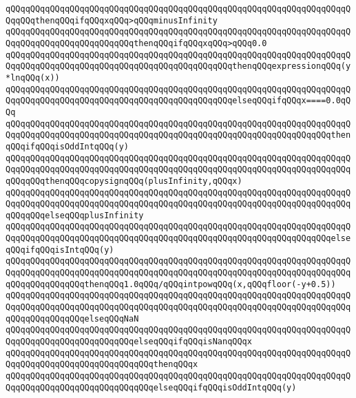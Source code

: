 \verb|qQQqqQQqqQQqqQQqqQQqqQQqqQQqqQQqqQQqqQQqqQQqqQQqqQQqqQQqqQQqqQQqqQQqqQQqqQQqthenqQQqifqQQqxqQQq>qQQqminusInfinity|\newline
\verb|qQQqqQQqqQQqqQQqqQQqqQQqqQQqqQQqqQQqqQQqqQQqqQQqqQQqqQQqqQQqqQQqqQQqqQQqqQQqqQQqqQQqqQQqqQQqqQQqthenqQQqifqQQqxqQQq>qQQq0.0|\newline
\verb|qQQqqQQqqQQqqQQqqQQqqQQqqQQqqQQqqQQqqQQqqQQqqQQqqQQqqQQqqQQqqQQqqQQqqQQqqQQqqQQqqQQqqQQqqQQqqQQqqQQqqQQqqQQqqQQqqQQqthenqQQqexpressionqQQq(y*lnqQQq(x))|\newline
\verb|qQQqqQQqqQQqqQQqqQQqqQQqqQQqqQQqqQQqqQQqqQQqqQQqqQQqqQQqqQQqqQQqqQQqqQQqqQQqqQQqqQQqqQQqqQQqqQQqqQQqqQQqqQQqqQQqqQQqelseqQQqifqQQqx====0.0qQQq|\newline
\verb|qQQqqQQqqQQqqQQqqQQqqQQqqQQqqQQqqQQqqQQqqQQqqQQqqQQqqQQqqQQqqQQqqQQqqQQqqQQqqQQqqQQqqQQqqQQqqQQqqQQqqQQqqQQqqQQqqQQqqQQqqQQqqQQqqQQqqQQqthenqQQqifqQQqisOddIntqQQq(y)|\newline
\verb|qQQqqQQqqQQqqQQqqQQqqQQqqQQqqQQqqQQqqQQqqQQqqQQqqQQqqQQqqQQqqQQqqQQqqQQqqQQqqQQqqQQqqQQqqQQqqQQqqQQqqQQqqQQqqQQqqQQqqQQqqQQqqQQqqQQqqQQqqQQqqQQqqQQqthenqQQqcopysignqQQq(plusInfinity,qQQqx)|\newline
\verb|qQQqqQQqqQQqqQQqqQQqqQQqqQQqqQQqqQQqqQQqqQQqqQQqqQQqqQQqqQQqqQQqqQQqqQQqqQQqqQQqqQQqqQQqqQQqqQQqqQQqqQQqqQQqqQQqqQQqqQQqqQQqqQQqqQQqqQQqqQQqqQQqqQQqelseqQQqplusInfinity|\newline
\verb|qQQqqQQqqQQqqQQqqQQqqQQqqQQqqQQqqQQqqQQqqQQqqQQqqQQqqQQqqQQqqQQqqQQqqQQqqQQqqQQqqQQqqQQqqQQqqQQqqQQqqQQqqQQqqQQqqQQqqQQqqQQqqQQqqQQqqQQqelseqQQqifqQQqisIntqQQq(y)|\newline
\verb|qQQqqQQqqQQqqQQqqQQqqQQqqQQqqQQqqQQqqQQqqQQqqQQqqQQqqQQqqQQqqQQqqQQqqQQqqQQqqQQqqQQqqQQqqQQqqQQqqQQqqQQqqQQqqQQqqQQqqQQqqQQqqQQqqQQqqQQqqQQqqQQqqQQqqQQqqQQqthenqQQq1.0qQQq/qQQqintpowqQQq(x,qQQqfloor(-y+0.5))|\newline
\verb|qQQqqQQqqQQqqQQqqQQqqQQqqQQqqQQqqQQqqQQqqQQqqQQqqQQqqQQqqQQqqQQqqQQqqQQqqQQqqQQqqQQqqQQqqQQqqQQqqQQqqQQqqQQqqQQqqQQqqQQqqQQqqQQqqQQqqQQqqQQqqQQqqQQqqQQqqQQqelseqQQqNaN|\newline
\verb|qQQqqQQqqQQqqQQqqQQqqQQqqQQqqQQqqQQqqQQqqQQqqQQqqQQqqQQqqQQqqQQqqQQqqQQqqQQqqQQqqQQqqQQqqQQqqQQqelseqQQqifqQQqisNanqQQqx|\newline
\verb|qQQqqQQqqQQqqQQqqQQqqQQqqQQqqQQqqQQqqQQqqQQqqQQqqQQqqQQqqQQqqQQqqQQqqQQqqQQqqQQqqQQqqQQqqQQqqQQqqQQqthenqQQqx|\newline
\verb|qQQqqQQqqQQqqQQqqQQqqQQqqQQqqQQqqQQqqQQqqQQqqQQqqQQqqQQqqQQqqQQqqQQqqQQqqQQqqQQqqQQqqQQqqQQqqQQqqQQqelseqQQqifqQQqisOddIntqQQq(y)|\newline
